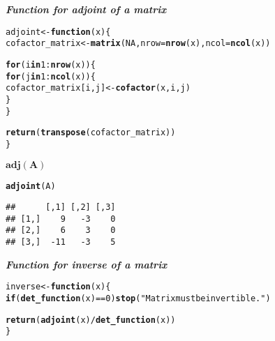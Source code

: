 \documentclass[11pt, a4paper]{article}\usepackage[]{graphicx}\usepackage[]{xcolor}
\makeatletter
\newcommand{\hlnum}[1]{\textcolor[rgb]{0.686,0.059,0.569}{#1}}%
\newcommand{\hlsng}[1]{\textcolor[rgb]{0.192,0.494,0.8}{#1}}%
\newcommand{\hlopt}[1]{\textcolor[rgb]{0,0,0}{#1}}%
\newcommand{\hldef}[1]{\textcolor[rgb]{0.345,0.345,0.345}{#1}}%
\newcommand{\hlkwa}[1]{\textcolor[rgb]{0.161,0.373,0.58}{\textbf{#1}}}%
\newcommand{\hlkwb}[1]{\textcolor[rgb]{0.69,0.353,0.396}{#1}}%
\newcommand{\hlkwc}[1]{\textcolor[rgb]{0.333,0.667,0.333}{#1}}%
\newcommand{\hlkwd}[1]{\textcolor[rgb]{0.737,0.353,0.396}{\textbf{#1}}}%
\newenvironment{kframe}{%
 \def\at@end@of@kframe{}%
 \ifinner\ifhmode%
  \def\at@end@of@kframe{\end{minipage}}%
  \begin{minipage}{\columnwidth}%
 \fi\fi%
 \def\FrameCommand##1{\hskip\@totalleftmargin \hskip-\fboxsep
 \colorbox{shadecolor}{##1}\hskip-\fboxsep
     \hskip-\linewidth \hskip-\@totalleftmargin \hskip\columnwidth}%
 \MakeFramed {\advance\hsize-\width
   \@totalleftmargin\z@ \linewidth\hsize
   \@setminipage}}%
 {\par\unskip\endMakeFramed%
 \at@end@of@kframe}
\newenvironment{knitrout}{}{} %
\makeatother
\begin{document}
\newpage

\faArrowAltCircleRight[regular] \textit{\textbf{Function for adjoint of a matrix}}

\begin{knitrout}
\color{fgcolor}\begin{kframe}
\begin{alltt}
\hldef{adjoint} \hlkwb{<-} \hlkwa{function}\hldef{(}\hlkwc{x}\hldef{)\{}
  \hldef{cofactor_matrix} \hlkwb{<-} \hlkwd{matrix}\hldef{(}\hlnum{NA}\hldef{,} \hlkwc{nrow} \hldef{=} \hlkwd{nrow}\hldef{(x),} \hlkwc{ncol} \hldef{=} \hlkwd{ncol}\hldef{(x))}

  \hlkwa{for} \hldef{(i} \hlkwa{in} \hlnum{1}\hlopt{:}\hlkwd{nrow}\hldef{(x)) \{}
    \hlkwa{for} \hldef{(j} \hlkwa{in} \hlnum{1}\hlopt{:}\hlkwd{ncol}\hldef{(x)) \{}
      \hldef{cofactor_matrix[i, j]} \hlkwb{<-} \hlkwd{cofactor}\hldef{(x, i, j)}
    \hldef{\}}
  \hldef{\}}

  \hlkwd{return}\hldef{(}\hlkwd{transpose}\hldef{(cofactor_matrix))}
\hldef{\}}
\end{alltt}
\end{kframe}
\end{knitrout}

\faArrowAltCircleRight[regular] $\mathbf{adj(A)}$

\begin{knitrout}
\color{fgcolor}\begin{kframe}
\begin{alltt}
\hlkwd{adjoint}\hldef{(A)}
\end{alltt}
\begin{verbatim}
##      [,1] [,2] [,3]
## [1,]    9   -3    0
## [2,]    6    3    0
## [3,]  -11   -3    5
\end{verbatim}
\end{kframe}
\end{knitrout}

\faArrowAltCircleRight[regular] \textit{\textbf{Function for inverse of a matrix}}

\begin{knitrout}
\color{fgcolor}\begin{kframe}
\begin{alltt}
\hldef{inverse} \hlkwb{<-} \hlkwa{function}\hldef{(}\hlkwc{x}\hldef{)\{}
  \hlkwa{if}\hldef{(}\hlkwd{det_function}\hldef{(x)} \hlopt{==} \hlnum{0}\hldef{)} \hlkwd{stop}\hldef{(}\hlsng{"Matrix must be invertible."}\hldef{)}

  \hlkwd{return}\hldef{(}\hlkwd{adjoint}\hldef{(x)} \hlopt{/} \hlkwd{det_function}\hldef{(x))}
\hldef{\}}
\end{alltt}
\end{kframe}
\end{knitrout}
\end{document}
